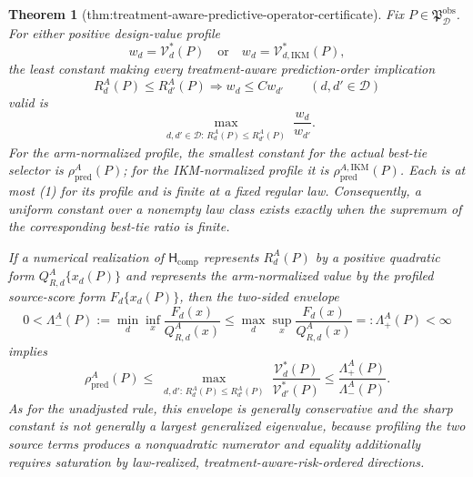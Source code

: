 \documentclass{article}
\newtheorem{theorem}{Theorem}
\begin{document}
\begin{theorem}[thm:treatment-aware-predictive-operator-certificate]\label{thm:treatment-aware-predictive-operator-certificate}
Fix \(P\in\mathfrak P_{\mathcal D}^{\mathrm{obs}}\). For either positive design-value profile
\[
 w_d=\mathcal V_d^*(P)
 \quad\text{or}\quad
 w_d=\mathcal V_{d,\mathrm{IKM}}^*(P),
\]
the least constant making every treatment-aware prediction-order implication
\[
 R_d^A(P)\le R_{d'}^A(P)\Longrightarrow w_d\le Cw_{d'}
 \qquad(d,d'\in\mathcal D)
\]
valid is
\[
 \max_{\substack{d,d'\in\mathcal D:\,R_d^A(P)\le R_{d'}^A(P)}}
 \frac{w_d}{w_{d'}}. \tag{1}
\]
For the arm-normalized profile, the smallest constant for the actual best-tie selector is \(\rho_{\mathrm{pred}}^A(P)\); for the IKM-normalized profile it is \(\rho_{\mathrm{pred}}^{A,\mathrm{IKM}}(P)\). Each is at most (1) for its profile and is finite at a fixed regular law. Consequently, a uniform constant over a nonempty law class exists exactly when the supremum of the corresponding best-tie ratio is finite.

If a numerical realization of \(\mathsf H_{\mathrm{comp}}\) represents \(R_d^A(P)\) by a positive quadratic form \(Q_{R,d}^A\{x_d(P)\}\) and represents the arm-normalized value by the profiled source-score form \(F_d\{x_d(P)\}\), then the two-sided envelope
\[
 0<\Lambda_-^A(P):=\min_d\inf_x\frac{F_d(x)}{Q_{R,d}^A(x)}
 \le
 \max_d\sup_x\frac{F_d(x)}{Q_{R,d}^A(x)}=:\Lambda_+^A(P)<\infty
\]
implies
\[
 \rho_{\mathrm{pred}}^A(P)
 \le\max_{\substack{d,d':\,R_d^A(P)\le R_{d'}^A(P)}}
 \frac{\mathcal V_d^*(P)}{\mathcal V_{d'}^*(P)}
 \le\frac{\Lambda_+^A(P)}{\Lambda_-^A(P)}. \tag{2}
\]
As for the unadjusted rule, this envelope is generally conservative and the sharp constant is not generally a largest generalized eigenvalue, because profiling the two source terms produces a nonquadratic numerator and equality additionally requires saturation by law-realized, treatment-aware-risk-ordered directions.
\end{theorem}
\end{document}
